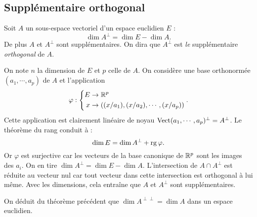 \subsection{Supplémentaire orthogonal}
\begin{thm} Soit $A$ un sous-espace vectoriel d'un espace euclidien $E$ : 
 \begin{displaymath}
 \dim A^{\perp} = \dim E - \dim A .
\end{displaymath}
De plus $A$ et $A^\perp$ sont supplémentaires. On dira que $A^\bot$ est \emph{le} supplémentaire \emph{orthogonal} de $A$.
\end{thm}
\begin{demo}
On note $n$ la dimension de $E$ et $p$ celle de $A$. On considère une base orthonormée $(a_1,\cdots,a_p)$ de $A$ et l'application
\begin{displaymath}
\varphi : \left\lbrace 
 \begin{aligned}
  E &\rightarrow \mathbb{R}^p \\
  x &\rightarrow \left( (x/a_1),(x/a_2),\cdots,(x/a_p)\right) 
 \end{aligned}
\right. .
\end{displaymath}
Cette application est clairement linéaire de noyau $\mathop{\mathrm{Vect}}(a_1,\cdots,a_p)^\bot= A^\bot$. Le théorème du rang conduit à :
\begin{displaymath}
 \dim E = \dim A^\bot +\mathop{\mathrm{rg}} \varphi .
\end{displaymath}
Or $\varphi$ est surjective car les vecteurs de la base canonique de $\mathbb{R}^p$ sont les images des $a_i$. On en tire $\dim A^\bot = \dim E - \dim A$.\newline
L'intersection de $A\cap A^\bot$ est réduite au vecteur nul car tout vecteur dans cette intersection est orthogonal à lui même. Avec les dimensions, cela entraîne que $A$ et $A^\bot$ sont supplémentaires.
\end{demo}
\begin{rem}
 On déduit du théorème précédent que $\dim A^{\perp\perp} = \dim A$ dans un espace euclidien.
\end{rem}

